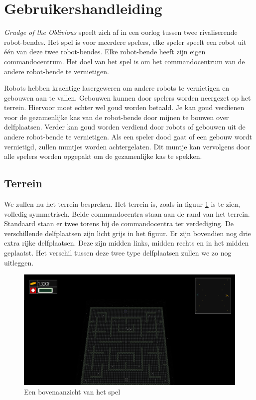     \section{Gebruikershandleiding}
    \label{app:handleiding}
    \emph{Grudge of the Oblivious} speelt zich af in een oorlog tussen twee rivaliserende robot-bendes. Het spel is voor meerdere spelers, elke speler speelt een robot uit \'e\'en van deze twee robot-bendes. Elke robot-bende heeft zijn eigen commandocentrum. Het doel van het spel is om het commandocentrum van de andere robot-bende te vernietigen.

    Robots hebben krachtige lasergeweren om andere robots te vernietigen en gebouwen aan te vallen. Gebouwen kunnen door spelers worden neergezet op het terrein. Hiervoor moet echter wel goud worden betaald. Je kan goud verdienen voor de gezamenlijke kas van de robot-bende door mijnen te bouwen over delfplaatsen. Verder kan goud worden verdiend door robots of gebouwen uit de andere robot-bende te vernietigen. Als een speler dood gaat of een gebouw wordt vernietigd, zullen muntjes worden achtergelaten. Dit muntje kan vervolgens door alle spelers worden opgepakt om de gezamenlijke kas te spekken.

	\subsection{Terrein}
    We zullen nu het terrein bespreken. Het terrein is, zoals in figuur \ref{fig:terrein} is te zien, volledig symmetrisch. Beide commandocentra staan aan de rand van het terrein. Standaard staan er twee torens bij de commandocentra ter verdediging. De verschillende delfplaatsen zijn licht grijs in het figuur. Er zijn bovendien nog drie extra rijke delfplaatsen. Deze zijn midden links, midden rechts en in het midden geplaatst. Het verschil tussen deze twee type delfplaatsen zullen we zo nog uitleggen.

    \begin{figure}[h]
        \centering
    	\includegraphics[width=\textwidth]{kaart.png}
	\caption{Een bovenaanzicht van het spel}
    \label{fig:terrein}
    \end{figure}

